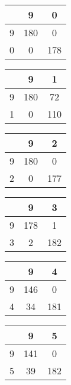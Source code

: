 \documentclass[12pt]{article}
\begin{document}
		\begin{multicols}{3}
			\begin{tabular}{| c | c | c |}
				\hline
				& 9 & 0 \\ 
				\hline
				9 & 180 & 0 \\ 
				\hline
				0 & 0 & 178 \\ 
				\hline
			\end{tabular}
			\newline


			\begin{tabular}{| c | c | c |}
				\hline
				& 9 & 1 \\ 
				\hline
				9 & 180 & 72 \\ 
				\hline
				1 & 0 & 110 \\ 
				\hline
			\end{tabular}
			\newline


			\begin{tabular}{| c | c | c |}
				\hline
				& 9 & 2 \\ 
				\hline
				9 & 180 & 0 \\ 
				\hline
				2 & 0 & 177 \\ 
				\hline
			\end{tabular}
			\newline


			\begin{tabular}{| c | c | c |}
				\hline
				& 9 & 3 \\ 
				\hline
				9 & 178 & 1 \\ 
				\hline
				3 & 2 & 182 \\ 
				\hline
			\end{tabular}
			\newline


			\begin{tabular}{| c | c | c |}
				\hline
				& 9 & 4 \\ 
				\hline
				9 & 146 & 0 \\ 
				\hline
				4 & 34 & 181 \\ 
				\hline
			\end{tabular}
			\newline


			\begin{tabular}{| c | c | c |}
				\hline
				& 9 & 5 \\ 
				\hline
				9 & 141 & 0 \\ 
				\hline
				5 & 39 & 182 \\ 
				\hline
			\end{tabular}
			\newline



\end{multicols}
\end{document}
